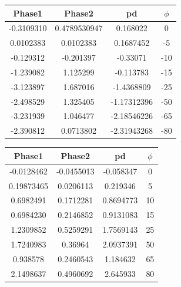 \documentclass[class=report,11pt,crop=false]{standalone}
\begin{document}
\begin{minipage}[!h]{.48\linewidth}\centering
\begin{center}
    \begin{tabular}{c|c|c|c|}
        \textbf{Phase1} & \textbf{Phase2} & \textbf{\gls{pd}} & \textbf{$\phi $}   \\
        \hline
        -0.3109310 & 0.4789530947 & 0.168022 & 0 \\
        0.0102383 & 0.0102383 & 0.1687452 & -5 \\
        -0.129312 & -0.201397 & -0.33071 & -10 \\
        -1.239082 & 1.125299 & -0.113783 & -15 \\
        -3.123897 & 1.687016 & -1.4368809 & -25 \\
        -2.498529 & 1.325405 &  -1.17312396& -50 \\
        -3.231939 & 1.046477 & -2.18546226 & -65 \\
        -2.390812 & 0.0713802 & -2.31943268 & -80 \\
    \end{tabular}
\end{center}
\end{minipage}%
\hspace{0.2cm}
\begin{minipage}[!h]{.48\linewidth}\centering
\begin{center}
    \begin{tabular}{c|c|c|c|}
        \textbf{Phase1} & \textbf{Phase2} & \textbf{\gls{pd}} & \textbf{$\phi $}   \\
        \hline
        -0.0128462 & -0.0455013 & -0.058347 & 0 \\
        0.19873465 &  0.0206113 & 0.219346 & 5 \\
        0.6982491 & 0.1712281 & 0.8694773 & 10 \\
        0.6984230 & 0.2146852 & 0.9131083 & 15 \\
        1.2309852 & 0.5259291 & 1.7569143 & 25 \\
        1.7240983 &  0.36964 & 2.0937391 & 50 \\
        0.938578 & 0.2460543 & 1.184632 & 65 \\
        2.1498637 & 0.4960692 & 2.645933 & 80 \\
    \end{tabular}
\end{center}
\end{minipage}
\end{document}
